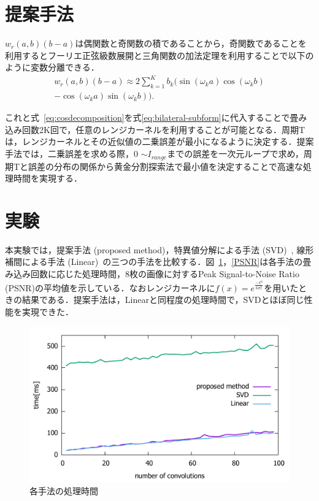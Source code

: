 \documentclass[twocolumn, a4paper]{./ieicejsp_tokai}
\begin{document}
\section{提案手法}
$w_r(a,b)(b-a)$は偶関数と奇関数の積であることから，奇関数であることを利用するとフーリエ正弦級数展開と三角関数の加法定理を利用することで以下のように変数分離できる．
\begin{align}
  w_{r}(a,b)(b-a) \approx 2\sum_{k=1}^{K}b_{k}(\sin(\omega_{k}a)\cos(\omega_{k}b) \nonumber  \\
    -\cos(\omega_{k}a)\sin(\omega_{k}b)). \label{eq:compressive-sin-decomp}
\end{align}

これと式~\eqref{eq:cosdecomposition}を式\eqref{eq:bilateral-subform}に代入することで畳み込み回数2K回で，任意のレンジカーネルを利用することが可能となる．周期Tは，レンジカーネルとその近似値の二乗誤差が最小になるように決定する．提案手法では，二乗誤差を求める際，0 $\sim I_{range}$までの誤差を一次元ループで求め，周期Tと誤差の分布の関係から黄金分割探索法で最小値を決定することで高速な処理時間を実現する．
%
\section{実験}
本実験では，提案手法 (proposed method)，特異値分解による手法 (SVD)~\cite{SVD}, 線形補間による手法 (Linear)~\cite{linear}の三つの手法を比較する．図~\ref{processing_time}，\ref{PSNR}は各手法の畳み込み回数に応じた処理時間，8枚の画像に対するPeak Signal-to-Noise Ratio (PSNR)の平均値を示している．なおレンジカーネルに$f(x)=e^{\frac{-x^{6}}{6\sigma_{r}^{6}}}$を用いたときの結果である．提案手法は，Linearと同程度の処理時間で，SVDとほぼ同じ性能を実現できた．
%
\begin{figure}[H]
 \begin{center}
  \includegraphics[scale = 0.22]{fig/processing_time.pdf}
  \caption{各手法の処理時間}
  \label{processing_time}
 \end{center}
\end{figure}
\end{document}
